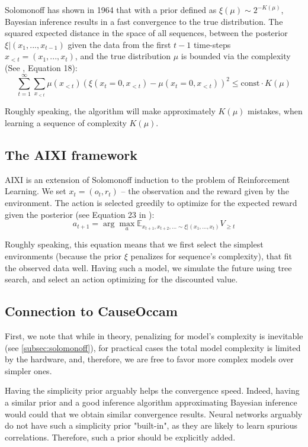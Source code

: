 \documentclass[a4paper,11pt,oneside]{report}
\newcommand{\sysname}{CauseOccam\xspace}
\begin{document}
Solomonoff has shown in 1964 that with a prior defined as $\xi(\mu)\sim 2^{-K(\mu)}$, Bayesian inference results in a fast convergence to the true distribution. The squared expected distance in the space of all sequences, between the posterior $\xi|(x_1,...,x_{t-1})$ given the data from the first $t-1$ time-steps $x_{< t}=(x_1,...,x_t)$, and the true distribution $\mu$ is bounded via the complexity (See \cite{Hutter2003}, Equation 18):
$$
\sum\limits_{t=1}^{\infty}\sum\limits_{x_{<t}}\mu(x_{<t})\left(\xi(x_t=0,x_{<t})-\mu(x_t=0,x_{<t})\right)^2\leq  \mbox{const}\cdot K(\mu)
$$

Roughly speaking, the algorithm will make approximately $K(\mu)$ mistakes, when learning a sequence of complexity $K(\mu)$.

\subsection{The AIXI framework}
\label{subsec:aixi}
AIXI\cite{Hutter2003} is an extension of Solomonoff induction to the problem of Reinforcement Learning. We set $x_t=(o_t,r_t)$ -- the observation and the reward given by the environment. The action is selected greedily to optimize for the expected reward given the posterior (see Equation 23 in \cite{Hutter2003}):
$$
a_{t+1}=\arg\max\limits_{a}\mathbb E_{x_{t+1},x_{t+2},...\sim \xi|(x_1,...,x_t)}V_{\geq t}
$$

Roughly speaking, this equation means that we first select the simplest environments (because the prior $\xi$ penalizes for sequence's complexity), that fit the observed data well. Having such a model, we simulate the future using tree search, and select an action optimizing for the discounted value.

\subsection{Connection to \sysname}
First, we note that while in theory, penalizing for model's complexity is inevitable (see \autoref{subsec:solomonoff}), for practical cases the total model complexity is limited by the hardware, and, therefore, we are free to favor more complex models over simpler ones.

Having the simplicity prior arguably helps the convergence speed. Indeed, having a similar prior and a good inference algorithm approximating Bayesian inference would could that we obtain similar convergence results. Neural networks arguably do not have such a simplicity prior "built-in", as they are likely to learn spurious correlations\cite{ilyas2019adversarial}. Therefore, such a prior should be explicitly added.
\end{document}

